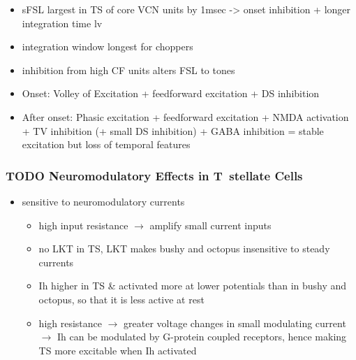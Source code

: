 \begin{itemize}
\item sFSL largest in TS of core VCN units by 1msec -> onset inhibition + longer integration time \citep{GisbergenGrashuisEtAl:1975,GisbergenGrashuisEtAl:1975a,GisbergenGrashuisEtAl:1975b,YoungRobertEtAl:1988,PaoliniClareyEtAl:2004}
  lv\item integration window longest for choppers \citep{McGinleyOertel:2006}
\item inhibition from high CF units alters FSL to tones \citep{Wickesberg:1996}
\item Onset: Volley of Excitation + feedforward excitation + DS inhibition
\item After onset: Phasic excitation + feedforward excitation + NMDA activation + TV inhibition (+ small DS inhibition) + GABA inhibition = stable excitation but loss of temporal features
\end{itemize}

\citep{JorisSmithEtAl:1994}


\subsubsection{TODO Neuromodulatory Effects in T~stellate Cells}




\begin{itemize}
\item sensitive to neuromodulatory currents \citep{FujinoOertel:2001}
\begin{itemize}
\item high input resistance $\rightarrow$ amplify small current inputs \citep{FujinoOertel:2001}
\item no LKT in TS,  LKT makes bushy and octopus insensitive to steady currents \citep{OertelFujino:2001,McGinleyOertel:2006}
\item Ih higher in TS \& activated more at lower potentials than in bushy and octopus, so that it is less active at rest
\item high resistance $\rightarrow$ greater voltage changes in small modulating current $\rightarrow$ Ih can be modulated by G-protein coupled receptors, hence making TS more excitable when Ih activated \citep{RodriguesOertel:2006}
\end{itemize}
\end{itemize}

